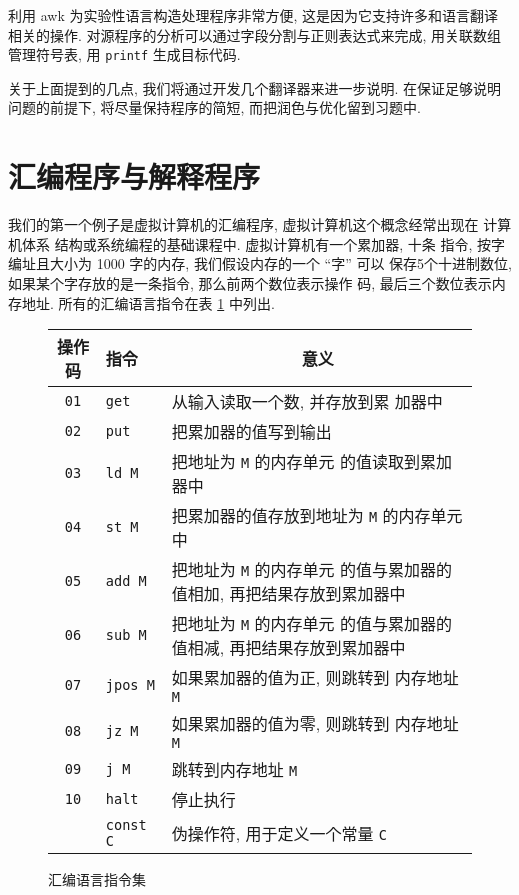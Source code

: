 利用 awk 为实验性语言构造处理程序非常方便, 这是因为它支持许多和语言翻译
相关的操作. 对源程序的分析可以通过字段分割与正则表达式来完成, 用关联数组
管理符号表, 用 \texttt{printf} 生成目标代码.

关于上面提到的几点, 我们将通过开发几个翻译器来进一步说明. 在保证足够说明
问题的前提下,  将尽量保持程序的简短, 而把润色与优化留到习题中.

\section{汇编程序与解释程序}
\label{subsec:an_assembler_and_interpreter}

我们的第一个例子是虚拟计算机的汇编程序, 虚拟计算机这个概念经常出现在
计算机体系 结构或系统编程的基础课程中. 虚拟计算机有一个累加器, 十条
指令, 按字编址且大小为 1000 字的内存, 我们假设内存的一个 ``字'' 可以
保存5个十进制数位, 如果某个字存放的是一条指令, 那么前两个数位表示操作
码, 最后三个数位表示内存地址. 所有的汇编语言指令在表
\ref{tbl:assembly_language_instructions} 中列出.
\begin{figure}[ht]
\captionsetup{type=table}
\caption{汇编语言指令集}
\label{tbl:assembly_language_instructions}
\begin{center}
    \begin{tabular}{c|l|l}
        \hline
        \hline
        操作码          & 指令    &
        \multicolumn{1}{c}{意义}  \\
        \hline
        \texttt{01}     & \texttt{get}  & 从输入读取一个数, 并存放到累
        加器中 \\
        \texttt{02}     & \texttt{put}  & 把累加器的值写到输出 \\
        \texttt{03}     & \texttt{ld M}  & 把地址为 \texttt{M} 的内存单元
        的值读取到累加器中 \\
        \texttt{04}     & \texttt{st M}  & 把累加器的值存放到地址为
        \texttt{M} 的内存单元中 \\
        \texttt{05}     & \texttt{add M} & 把地址为 \texttt{M} 的内存单元
        的值与累加器的值相加, 再把结果存放到累加器中 \\
        \texttt{06}     & \texttt{sub M} & 把地址为 \texttt{M} 的内存单元
        的值与累加器的值相减, 再把结果存放到累加器中 \\
        \texttt{07}     & \texttt{jpos M} & 如果累加器的值为正, 则跳转到
        内存地址 \texttt{M} \\
        \texttt{08}     & \texttt{jz M} & 如果累加器的值为零, 则跳转到
        内存地址 \texttt{M}     \\
        \texttt{09}     & \texttt{j M}  & 跳转到内存地址 \texttt{M} \\
        \texttt{10}     & \texttt{halt} & 停止执行 \\
                        & \texttt{const C} & 伪操作符, 用于定义一个常量
                        \texttt{C} \\
        \hline
    \end{tabular}
\end{center}
\end{figure}

